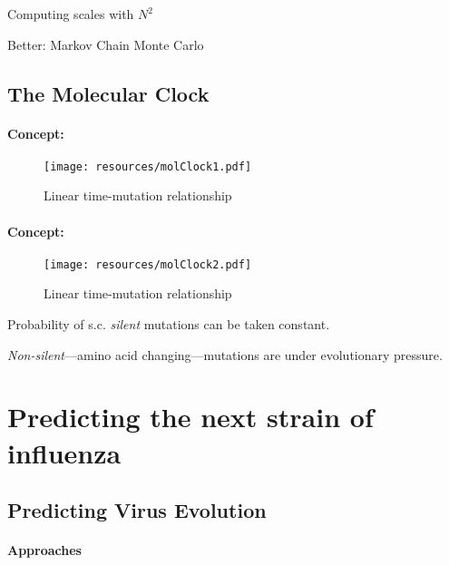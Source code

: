 \documentclass{beamer}
\begin{document}
\begin{darkframes}
\begin{frame}{\secname}
      Computing scales with $N^2$

      Better: Markov Chain Monte Carlo

    \end{frame}


    \subsection{The Molecular Clock}

    \begin{frame}{\secname}
      \framesubtitle{Concept: \subsecname}
      \begin{figure}
        \texttt{[image: resources/molClock1.pdf]}
        \caption{\footnotesize Linear time-mutation relationship}
      \end{figure}
      \addtocounter{figure}{-1}
    \end{frame}


    \begin{frame}{\secname}
      \framesubtitle{Concept: \subsecname}
      \begin{figure}
        \texttt{[image: resources/molClock2.pdf]}
        \caption{\footnotesize Linear time-mutation relationship}
      \end{figure}
      \vspace*{-.6cm}
      \footnotesize
      Probability of s.c. \textit{silent} mutations can be taken constant.

      \textit{Non-silent}---amino acid changing---mutations are under evolutionary pressure.
    \end{frame}





  \section{Predicting the next strain of influenza}



    \subsection{Predicting Virus Evolution}

    \begin{frame}{\secname}
      \framesubtitle{Approaches}

\end{frame}
\end{darkframes}
\end{document}
